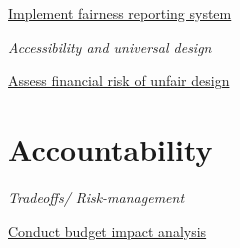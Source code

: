 \documentclass[
  letterpaper,
  DIV=11,
  numbers=noendperiod]{scrreport}
\begin{document}
\protect\hyperlink{implement-fairness-reporting-system}{Implement
fairness reporting system}

\emph{Accessibility and universal design}

\protect\hyperlink{assess-financial-risk-of-unfair-design}{Assess
financial risk of unfair design}

\hypertarget{accountability-5}{%
\section*{Accountability}\label{accountability-5}}


\emph{Tradeoffs/ Risk-management}

\protect\hyperlink{conduct-budget-impact-analysis}{Conduct budget impact
analysis}
\end{document}
